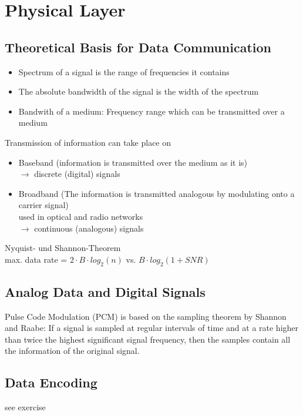 \documentclass[11pt,ngerman]{article}
\begin{document}

\section{Physical Layer}

\subsection{Theoretical	Basis	for	Data	Communication}
\begin{itemize}[noitemsep,nolistsep]
\item Spectrum of	a	signal	is	the	range	of	
frequencies	it	contains
\item The	absolute	bandwidth of	the	signal	
is	the	width	of	the	spectrum
\item Bandwith of a medium: Frequency	range	which	can	be	
transmitted	over	a	medium
\end{itemize}

Transmission	of	information	can	take	place	on	
\begin{itemize}[noitemsep,nolistsep]
\item Baseband (information	is	transmitted	over	the	medium	as	it	is)\\
	$\rightarrow$ discrete	(digital) signals
\item Broadband (The	information	is	transmitted	analogous by modulating onto a carrier signal)\\
	used in optical and radio networks\\
	$\rightarrow$ continuous	(analogous)	signals
\end{itemize}

Nyquist- und	Shannon-Theorem\\
max.	data	rate	=	$2 \cdot B \cdot log_2 (n)$ vs. $B \cdot log_2 (1+SNR)$

\subsection{Analog	Data	and	Digital	Signals}

Pulse	Code	Modulation	(PCM)	is	based	on	the	sampling	theorem	
by	Shannon	and	Raabe: If	a	signal	is	sampled	at	regular	intervals	of	time	and	at	a	rate	higher	than	twice	the	highest	
significant	signal	frequency,	then	the	samples	contain	all	the	information	of	the	original	
signal.

\subsection{Data	Encoding}
see exercise
\end{document}
